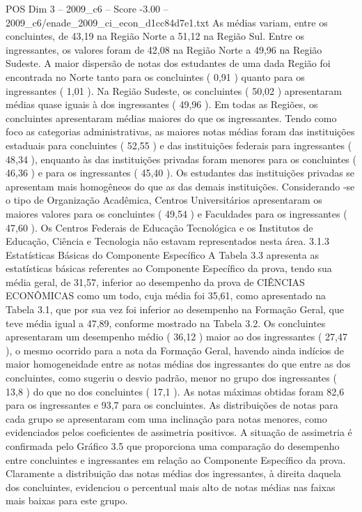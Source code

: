 \begin{textsample}{POS Dim 3 – 2009\_c6 – Score -3.00 – 2009\_c6/enade\_2009\_ci\_econ\_d1cc84d7e1.txt}
As médias variam, entre os concluintes, de 43,19 na Região Norte a 51,12 na Região Sul.
Entre os ingressantes, os valores foram de 42,08 na Região Norte a 49,96 na Região Sudeste.
A maior dispersão de notas dos estudantes de uma dada Região foi encontrada no Norte tanto para os concluintes ( 0,91 ) quanto para os ingressantes ( 1,01 ).
Na Região Sudeste, os concluintes ( 50,02 ) apresentaram médias quase iguais à dos ingressantes ( 49,96 ).
Em todas as Regiões, os concluintes apresentaram médias maiores do que os ingressantes.
Tendo como foco as categorias administrativas, as maiores notas médias foram das instituições estaduais para concluintes ( 52,55 ) e das instituições federais para ingressantes ( 48,34 ), enquanto às das instituições privadas foram menores para os concluintes ( 46,36 ) e para os ingressantes ( 45,40 ).
Os estudantes das instituições privadas se apresentam mais homogêneos do que as das demais instituições.
Considerando -se o tipo de Organização Acadêmica, Centros Universitários apresentaram os maiores valores para os concluintes ( 49,54 ) e Faculdades para os ingressantes ( 47,60 ).
Os Centros Federais de Educação Tecnológica e os Institutos de Educação, Ciência e Tecnologia não estavam representados nesta área. 3.1.3 Estatísticas Básicas do Componente Específico A Tabela 3.3 apresenta as estatísticas básicas referentes ao Componente Específico da prova, tendo sua média geral, de 31,57, inferior ao desempenho da prova de CIÊNCIAS ECONÔMICAS como um todo, cuja média foi 35,61, como apresentado na Tabela 3.1, que por sua vez foi inferior ao desempenho na Formação Geral, que teve média igual a 47,89, conforme mostrado na Tabela 3.2.
Os concluintes apresentaram um desempenho médio ( 36,12 ) maior ao dos ingressantes ( 27,47 ), o mesmo ocorrido para a nota da Formação Geral, havendo ainda indícios de maior homogeneidade entre as notas médias dos ingressantes do que entre as dos concluintes, como sugeriu o desvio padrão, menor no grupo dos ingressantes ( 13,8 ) do que no dos concluintes ( 17,1 ).
As notas máximas obtidas foram 82,6 para os ingressantes e 93,7 para os concluintes.
As distribuições de notas para cada grupo se apresentaram com uma inclinação para notas menores, como evidenciados pelos coeficientes de assimetria positivos.
A situação de assimetria é confirmada pelo Gráfico 3.5 que proporciona uma comparação do desempenho entre concluintes e ingressantes em relação ao Componente Específico da prova.
Claramente a distribuição das notas médias dos ingressantes, à direita daquela dos concluintes, evidenciou o percentual mais alto de notas médias nas faixas mais baixas para este grupo.

\end{textsample}
